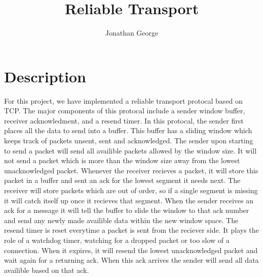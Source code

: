 \documentclass[11pt]{article}
\begin{document}
\lstset{
  language=Python,
  basicstyle=\small,          %
  keywordstyle=\bfseries,
  identifierstyle=,           %
  commentstyle=,              %
  stringstyle=\ttfamily,      %
  showstringspaces=false,     %
  numbers=left,
  numberstyle=\tiny,
  numbersep=5pt,
  frame=tb,
}

\title{Reliable Transport}

\author{Jonathan George}

\date{}

\maketitle

\section{Description}
For this project, we have implemented a reliable transport protocal based on TCP. The major components of this protocal include a sender window buffer, receiver acknowledment, and a resend timer. 
In this protocal, the sender first places all the data to send into a buffer. This buffer has a sliding window which keeps track of packets unsent, sent and acknowledged. 
The sender upon starting to send a packet will send all availible packets allowed by the window size. It will not send a packet which is more than the window size away from the lowest unacknowledged packet.
Whenever the receiver recieves a packet, it will store this packet in a buffer and sent an ack for the lowest segment it needs next. The receiver will store packets which are out of order, so if a single segment is missing it will catch itself up once it recieves that segment.
When the sender receives an ack for a message it will tell the buffer to slide the window to that ack number and send any newly made availible data within the new window space. 
The resend timer is reset everytime a packet is sent from the reciever side. It plays the role of a watchdog timer, watching for a dropped packet or too slow of a connection. When it expires, it will resend the lowest unacknowledged packet and wait again for a returning ack. When this ack arrives the sender will send all data availible based on that ack.
\end{document}
